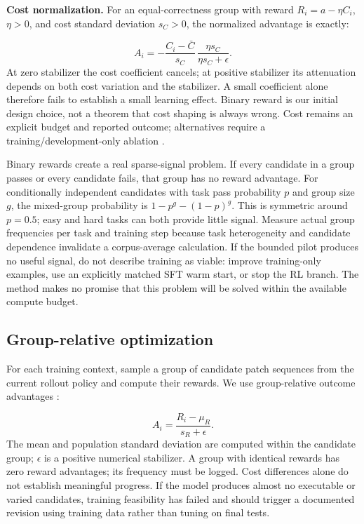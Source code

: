 \documentclass[11pt,a4paper]{article}
\begin{document}
\textbf{Cost normalization.} For an equal-correctness group with reward $R_i=a-\eta C_i$, $\eta>0$, and cost standard deviation $s_C>0$, the normalized advantage is exactly:

\begin{equation}
A_i=-\frac{C_i-\bar C}{s_C}\,
\frac{\eta s_C}{\eta s_C+\epsilon}.
\end{equation}
At zero stabilizer the cost coefficient cancels; at positive stabilizer its attenuation depends on both cost variation and the stabilizer. A small coefficient alone therefore fails to establish a small learning effect. Binary reward is our initial design choice, not a theorem that cost shaping is always wrong. Cost remains an explicit budget and reported outcome; alternatives require a training/development-only ablation \cite{ref17}.

Binary rewards create a real sparse-signal problem. If every candidate in a group passes or every candidate fails, that group has no reward advantage. For conditionally independent candidates with task pass probability $p$ and group size $g$, the mixed-group probability is $1-p^g-(1-p)^g$. This is symmetric around $p=0.5$; easy and hard tasks can both provide little signal. Measure actual group frequencies per task and training step because task heterogeneity and candidate dependence invalidate a corpus-average calculation. If the bounded pilot produces no useful signal, do not describe training as viable: improve training-only examples, use an explicitly matched SFT warm start, or stop the RL branch. The method makes no promise that this problem will be solved within the available compute budget.

\subsection{Group-relative optimization}
For each training context, sample a group of candidate patch sequences from the current rollout policy and compute their rewards. We use group-relative outcome advantages \cite{ref12}:

\begin{equation}
A_i=\frac{R_i-\mu_R}{s_R+\epsilon}.
\end{equation}
The mean and population standard deviation are computed within the candidate group; $\epsilon$ is a positive numerical stabilizer. A group with identical rewards has zero reward advantages; its frequency must be logged. Cost differences alone do not establish meaningful progress. If the model produces almost no executable or varied candidates, training feasibility has failed and should trigger a documented revision using training data rather than tuning on final tests.
\end{document}
